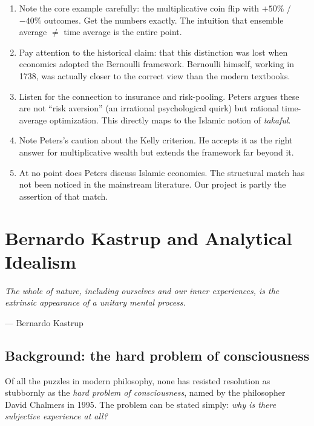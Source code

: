 \documentclass[11pt,a4paper]{book}
\theoremstyle{cleanrm}
\begin{document}
\begin{watchbox}
\begin{enumerate}[leftmargin=2em]
    \item Note the core example carefully: the multiplicative coin
    flip with $+50\%$ / $-40\%$ outcomes. Get the numbers exactly. The
    intuition that ensemble average $\neq$ time average is the entire
    point.
    \item Pay attention to the historical claim: that this distinction
    was lost when economics adopted the Bernoulli framework.
    Bernoulli himself, working in 1738, was actually closer to the
    correct view than the modern textbooks.
    \item Listen for the connection to insurance and risk-pooling.
    Peters argues these are not ``risk aversion'' (an irrational
    psychological quirk) but rational time-average optimization.
    This directly maps to the Islamic notion of \emph{takaful}.
    \item Note Peters's caution about the Kelly criterion. He
    accepts it as the right answer for multiplicative wealth
    but extends the framework far beyond it.
    \item At no point does Peters discuss Islamic economics.
    The structural match has not been noticed in the mainstream
    literature. Our project is partly the assertion of that match.
\end{enumerate}
\end{watchbox}

\chapter{Bernardo Kastrup and Analytical Idealism}

\epigraph{\itshape The whole of nature, including ourselves and our
inner experiences, is the extrinsic appearance of a unitary mental
process.}{--- Bernardo Kastrup}

\section{Background: the hard problem of consciousness}

Of all the puzzles in modern philosophy, none has resisted resolution
as stubbornly as the \emph{hard problem of consciousness}, named by
the philosopher David Chalmers in 1995. The problem can be stated
simply: \emph{why is there subjective experience at all?}
\end{document}
